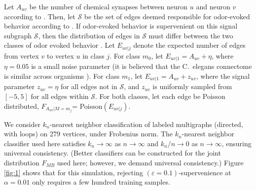 \documentclass{article}
\newcommand{\eps}{\varepsilon}
\providecommand{\mc}[1]{\mathcal{#1}}
\begin{document}
Let $A_{uv}$ be the number of chemical synapses between neuron $u$ and neuron $v$ according to \cite{VarshneyChklovskii09}.  Then, let $\mc{S}$ be the set of edges deemed responsible for odor-evoked behavior according to \cite{ChalasaniBargmann07}.  If odor-evoked behavior is supervenient on this signal subgraph $\mc{S}$, then the distribution of edges in $\mc{S}$ must differ between the two classes of odor evoked behavior \cite{VP11_sigsub}.  Let $E_{uv|j}$ denote the expected number of edges from vertex $v$ to vertex $u$ in class $j$.   For class $m_0$, let $E_{uv|1}=A_{uv}+\eta$,  where $\eta=0.05$ is a small noise parameter  (it is believed that the C.~elegans connectome is similar across organisms \cite{Durbin87}). For class $m_1$, let $E_{uv|1}=A_{uv}+z_{uv}$, where the signal parameter $z_{uv}=\eta$ for all edges not in $\mc{S}$, and $z_{uv}$ is uniformly sampled from $[-5,5]$ for all edges within $\mc{S}$. For both classes, let each edge be Poisson distributed, $F_{A_{uv}|M=m_j}$= Poisson$(E_{uv|j})$.


We consider $k_n$-nearest neighbor classification of labeled multigraphs (directed, with loops) on 279 vertices, under Frobenius norm. The $k_n$-nearest neighbor classifier used here satisfies $k_n \rightarrow \infty$ as $n \rightarrow \infty$ and $k_n/n \rightarrow 0$ as $n \rightarrow \infty$, ensuring universal consistency. (Better classifiers can be constructed for the joint distribution $F_{MB}$ used here; however, we demand universal consistency.)  Figure \ref{fig:1} shows that for this simulation, rejecting $(\eps=0.1)$-supervenience at $\alpha=0.01$ only requires a few hundred training samples.


\end{document}

